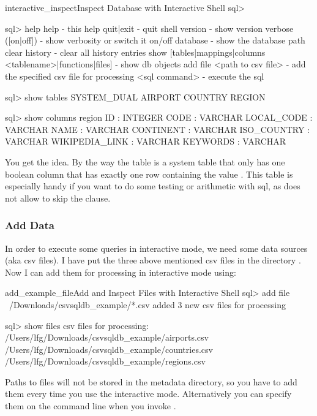 \begin{ShellListing}{interactive_inspect}{Inspect Database with Interactive Shell}
sql>

sql> help
help - this help
quit|exit - quit shell
version - show version
verbose ([on|off]) - show verbosity or switch it on/off
database - show the database path
clear history - clear all history entries
show [tables|mappings|columns <tablename>|functions|files] - show db objects
add file <path to csv file> - add the specified csv file for processing
<sql command> - execute the sql

sql> show tables
SYSTEM_DUAL
AIRPORT
COUNTRY
REGION

sql> show columns region
ID : INTEGER
CODE : VARCHAR
LOCAL_CODE : VARCHAR
NAME : VARCHAR
CONTINENT : VARCHAR
ISO_COUNTRY : VARCHAR
WIKIPEDIA_LINK : VARCHAR
KEYWORDS : VARCHAR
\end{ShellListing}

You get the idea. By the way the  table is a system table that only has one boolean column  that has exactly one row containing the value . This table is especially handy if you want to do some testing or arithmetic with sql, as \csvsqldb{} does not allow to skip the  clause.

\subsubsection{Add Data}
In order to execute some queries in interactive mode, we need some data sources (aka csv files). I have put the three above mentioned csv files in the directory . Now I can add them for processing in interactive mode using:

\begin{ShellListing}{add_example_file}{Add and Inspect Files with Interactive Shell}
sql> add file ~/Downloads/csvsqldb_example/*.csv
added 3 new csv files for processing

sql> show files
csv files for processing:
/Users/lfg/Downloads/csvsqldb_example/airports.csv
/Users/lfg/Downloads/csvsqldb_example/countries.csv
/Users/lfg/Downloads/csvsqldb_example/regions.csv
\end{ShellListing}

Paths to files will not be stored in the metadata directory, so you have to add them every time you use the interactive mode. Alternatively you can specify them on the command line when you invoke \csvsqldb{} .


